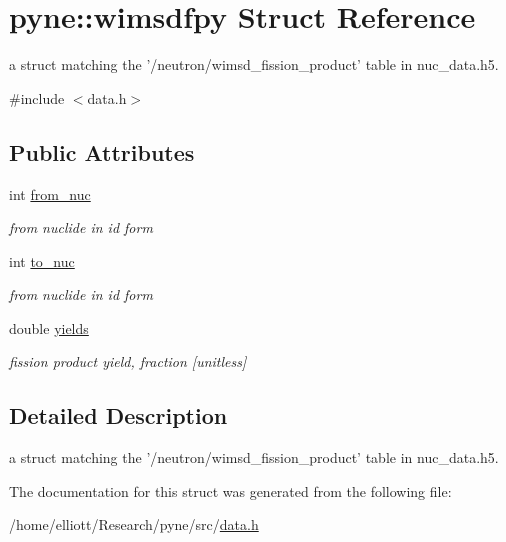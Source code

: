 \hypertarget{structpyne_1_1wimsdfpy}{\section{pyne\-:\-:wimsdfpy Struct Reference}
\label{structpyne_1_1wimsdfpy}
}


a struct matching the '/neutron/wimsd\-\_\-fission\-\_\-product' table in nuc\-\_\-data.\-h5.  




{\ttfamily \#include $<$data.\-h$>$}

\subsection*{Public Attributes}
\begin{DoxyCompactItemize}
\item 
\hypertarget{structpyne_1_1wimsdfpy_a7521e458719ebb8ed23f4912ec4555f8}{int \hyperlink{structpyne_1_1wimsdfpy_a7521e458719ebb8ed23f4912ec4555f8}{from\-\_\-nuc}}\label{structpyne_1_1wimsdfpy_a7521e458719ebb8ed23f4912ec4555f8}

\begin{DoxyCompactList}\small\item\em from nuclide in id form \end{DoxyCompactList}\item 
\hypertarget{structpyne_1_1wimsdfpy_a2a0f913a64fb76c5c82e1212df7fbb6c}{int \hyperlink{structpyne_1_1wimsdfpy_a2a0f913a64fb76c5c82e1212df7fbb6c}{to\-\_\-nuc}}\label{structpyne_1_1wimsdfpy_a2a0f913a64fb76c5c82e1212df7fbb6c}

\begin{DoxyCompactList}\small\item\em from nuclide in id form \end{DoxyCompactList}\item 
\hypertarget{structpyne_1_1wimsdfpy_a1c20eef7a02f2f62dba113cbf24d8bf2}{double \hyperlink{structpyne_1_1wimsdfpy_a1c20eef7a02f2f62dba113cbf24d8bf2}{yields}}\label{structpyne_1_1wimsdfpy_a1c20eef7a02f2f62dba113cbf24d8bf2}

\begin{DoxyCompactList}\small\item\em fission product yield, fraction \mbox{[}unitless\mbox{]} \end{DoxyCompactList}\end{DoxyCompactItemize}


\subsection{Detailed Description}
a struct matching the '/neutron/wimsd\-\_\-fission\-\_\-product' table in nuc\-\_\-data.\-h5. 

The documentation for this struct was generated from the following file\-:\begin{DoxyCompactItemize}
\item 
/home/elliott/\-Research/pyne/src/\hyperlink{data_8h}{data.\-h}\end{DoxyCompactItemize}
